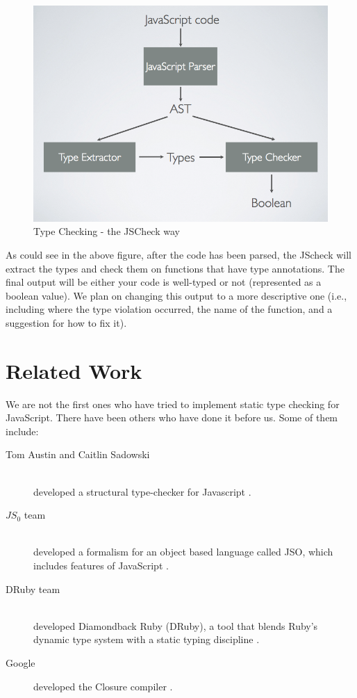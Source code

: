\documentclass{article}
\begin{document}
\begin{figure}[here]
  \begin{center}
    \includegraphics[scale=0.5]{blockdiagram.png}
  \end{center}
  \caption{Type Checking - the JSCheck way}
  \label{fig:jscheckway}
\end{figure}
\pagebreak



As could see in the above figure, after the code has been parsed, the JScheck will 
extract the types and check them on functions that have type annotations. The final 
output will be either your code is well-typed or not (represented as a boolean value). 
We plan on changing this output to a more descriptive one (i.e., including where the
type violation occurred, the name of the function, and a suggestion for how to fix it). 


\section{Related Work}
\label{sec:related}
We are not the first ones who have tried to implement static type checking for JavaScript.
There have been others who have done it before us. Some of them include:

\begin{description}
  \item[Tom Austin and Caitlin Sadowski] \hfill \\ 
  developed a structural type-checker for Javascript \cite{fwjsStruct}.
  \item[$JS_0$ team] \hfill \\ 
  developed a formalism for an object based language called JSO, which includes features of JavaScript 
  \cite{typeinferenceforjavascriptEcoop,typecheckingforjavascript}. 
  \item[DRuby team] \hfill \\ 
  developed Diamondback Ruby (DRuby), a tool that blends Ruby's dynamic type 
  system with a static typing discipline \cite{typecheckingruby}.
  \item[Google] developed the Closure compiler \cite{closureCompiler}.  
\end{description}
\end{document}
